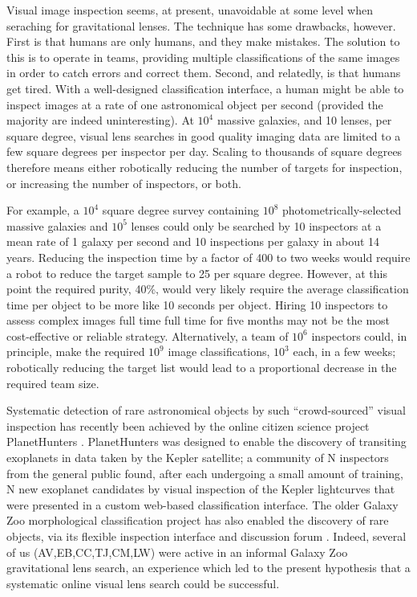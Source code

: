 \documentclass[useAMS,usenatbib,a4paper]{mn2e}
\begin{document}
Visual image inspection seems, at present, unavoidable at some level when
seraching for gravitational lenses. The technique has some drawbacks, however.
First is that humans are only humans, and they make mistakes. The solution to
this is to operate in teams, providing multiple classifications of the same
images in order to catch errors and correct them. Second, and relatedly, is
that humans get tired. With a well-designed classification interface, a human
might be able to inspect images at a rate of one astronomical object per
second (provided the majority are indeed uninteresting). At $10^4$ massive
galaxies, and 10 lenses, per square degree, visual lens searches in good
quality imaging data are limited to a few square degrees per inspector per
day. Scaling to thousands of square degrees therefore means either robotically
reducing the number of targets for inspection, or increasing the number of
inspectors, or both. 

For example, a $10^4$ square degree survey containing $10^8$
photometrically-selected massive galaxies and $10^5$ lenses could only be
searched by 10 inspectors at a mean rate of 1 galaxy per second and 10
inspections per galaxy in about 14 years. Reducing the inspection time by a
factor of 400 to two weeks would require a robot to reduce the target sample
to 25 per square degree. However, at this point the required purity, 40\%,
would very likely require the average classification time per object to be
more like 10 seconds per object. Hiring 10 inspectors to assess complex images
full time full time for five months may not be the most cost-effective or
reliable strategy. Alternatively, a team of $10^6$ inspectors could, in
principle, make the required $10^9$ image classifications, $10^3$ each, in a
few weeks; robotically reducing the target list would lead to a proportional
decrease in the required team size.

Systematic detection of rare astronomical objects by such ``crowd-sourced''
visual inspection has recently been achieved by the online citizen science
project PlanetHunters \citep{SchwambEtal2012}. PlanetHunters was designed to
enable the discovery of transiting exoplanets in data taken by the Kepler
satellite; a community of N inspectors from the general public found, after
each undergoing a small amount of training, N new exoplanet candidates by
visual inspection of the Kepler lightcurves that were presented in a custom
web-based classification interface. The older Galaxy Zoo morphological
classification project \citep{LintottEtal2008} has also enabled the discovery
of rare objects, via its flexible inspection interface and discussion forum
\citep{LintottEtal2009}. Indeed, several of us (AV,EB,CC,TJ,CM,LW) were active
in an informal Galaxy Zoo gravitational lens search, an experience which led
to the present hypothesis that a systematic online visual lens search could be
successful. 
\end{document}
